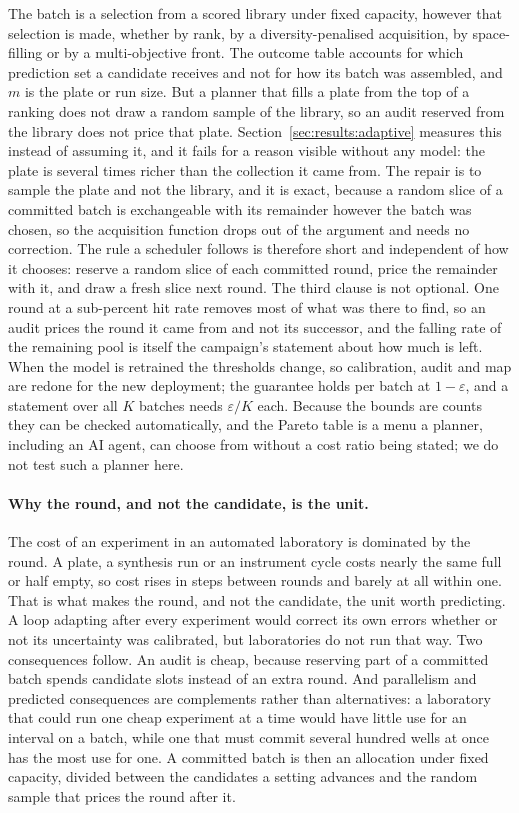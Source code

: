 \documentclass[twocolumn,10pt]{article}
\begin{document}
The batch is a selection from a scored library under fixed capacity, however that selection is made, whether by rank, by a diversity-penalised acquisition, by space-filling or by a multi-objective front.\citep{Gonzalez2016LP,HernandezLobato2017TS,Shields2021EDBO,Joseph2016SFD,Kusne2020CAMEO,Eriksson2019TuRBO,Daulton2020qEHVI}
The outcome table accounts for which prediction set a candidate receives and not for how its batch was assembled, and $m$ is the plate or run size. But a planner that fills a plate from the top of
a ranking does not draw a random sample of the library, so an audit reserved from the library does not price that plate. Section~\ref{sec:results:adaptive} measures this instead of assuming it, and it fails for a reason visible without any model: the plate is several times richer than the
collection it came from. The repair is to sample the plate and not the library, and it is exact,
because a random slice of a committed batch is exchangeable with its remainder however the batch
was chosen, so the acquisition function drops out of the argument and needs no correction. The
rule a scheduler follows is therefore short and independent of how it chooses: reserve a random
slice of each committed round, price the remainder with it, and draw a fresh slice next round.
The third clause is not optional. One round at a sub-percent hit rate removes most of what was there to find, so an audit prices the round it came from and not its successor, and the falling rate of the remaining pool is itself the campaign's statement about how much is left. When the
model is retrained the thresholds change, so calibration, audit and map are redone for the new
deployment; the guarantee holds per batch at $1-\varepsilon$, and a statement over all $K$ batches
needs $\varepsilon/K$ each. Because the bounds are counts they can be checked automatically, and
the Pareto table is a menu a planner, including an AI agent, can choose from without a cost ratio
being stated; we do not test such a planner here.

\paragraph{Why the round, and not the candidate, is the unit.} The cost of an experiment in an automated laboratory is dominated by the round. A plate, a synthesis run or an instrument cycle costs nearly the same full or half empty, so cost rises in steps between rounds and barely at all within one. That is what makes the round, and not the candidate, the unit worth predicting. A loop adapting after every experiment would correct its own errors whether or not its uncertainty was calibrated, but laboratories do not run that way. Two consequences follow. An audit is cheap, because reserving part of a committed batch spends candidate slots instead of an extra round. And parallelism and predicted
consequences are complements rather than alternatives: a laboratory that could run one cheap
experiment at a time would have little use for an interval on a batch, while one that must
commit several hundred wells at once has the most use for one. A committed batch is then an
allocation under fixed capacity, divided between the candidates a setting advances and the random
sample that prices the round after it.
\end{document}
